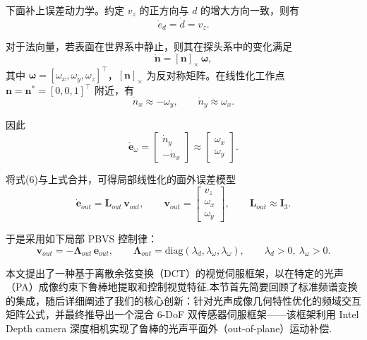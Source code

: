 \documentclass{article}
\begin{document}
下面补上误差动力学。约定 $v_z$ 的正方向与 $d$ 的增大方向一致，则有
\begin{equation}
\dot{e}_d = \dot{d} = v_z .
\end{equation}

对于法向量，若表面在世界系中静止，则其在探头系中的变化满足
\begin{equation}
\dot{\mathbf{n}} = [\mathbf{n}]_{\times}\,\boldsymbol{\omega},
\end{equation}
其中 $\boldsymbol{\omega} = [\omega_x, \omega_y, \omega_z]^\top$，$[\mathbf{n}]_{\times}$ 为反对称矩阵。在线性化工作点 $\mathbf{n} = \mathbf{n}^{*} = [0,0,1]^\top$ 附近，有
\begin{equation}
\dot{n}_x \approx -\omega_y, \qquad \dot{n}_y \approx \omega_x .
\end{equation}

因此
\begin{equation}
\dot{\mathbf{e}}_{\omega}
=
\begin{bmatrix}
\dot{n}_y \\ -\dot{n}_x
\end{bmatrix}
\approx
\begin{bmatrix}
\omega_x \\ \omega_y
\end{bmatrix}.
\end{equation}

将式(6)与上式合并，可得局部线性化的面外误差模型
\begin{equation}
\dot{\mathbf{e}}_{out} = \mathbf{L}_{out}\,\mathbf{v}_{out}, \qquad
\mathbf{v}_{out} =
\begin{bmatrix}
v_z \\ \omega_x \\ \omega_y
\end{bmatrix}, \qquad
\mathbf{L}_{out} \approx \mathbf{I}_3 .
\end{equation}

于是采用如下局部 PBVS 控制律：
\begin{equation}
\mathbf{v}_{out} = -\boldsymbol{\Lambda}_{out}\,\mathbf{e}_{out}, \qquad
\boldsymbol{\Lambda}_{out} = \mathrm{diag}(\lambda_d, \lambda_{\omega}, \lambda_{\omega}),
\qquad \lambda_d > 0,\ \lambda_{\omega} > 0 .
\end{equation}
\label{sec:algorithm}

本文提出了一种基于离散余弦变换（DCT）的视觉伺服框架，以在特定的光声（PA）成像约束下鲁棒地提取和控制视觉特征.本节首先简要回顾了标准频谱变换的集成，随后详细阐述了我们的核心创新：针对光声成像几何特性优化的频域交互矩阵公式，并最终推导出一个混合 6-DoF 双传感器伺服框架——该框架利用 Intel Depth camera 深度相机实现了鲁棒的光声平面外（out-of-plane）运动补偿.
\end{document}
